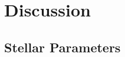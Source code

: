 \documentclass[useAMS,usenatbib]{mn2e}
\begin{document}

\section{Discussion} %
\label{sec:discussion}


\subsection{Stellar Parameters} %
\label{sub:stellar_parameters_disc}



\end{document}
